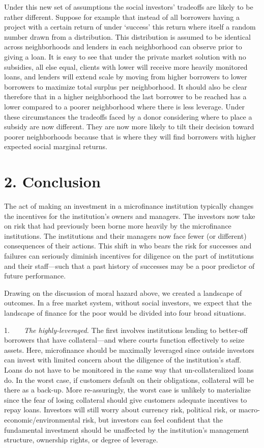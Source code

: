 \documentclass{article}
\begin{document}
Under this new set of assumptions the social investors' tradeoffs are
likely to be rather different. Suppose for example that instead of all
borrowers having a project with a certain return of under `success' this
return where itself a random number drawn from a distribution. This
distribution is assumed to be identical across neighborhoods and lenders
in each neighborhood can observe prior to giving a loan. It is easy to
see that under the private market solution with no subsidies, all else
equal, clients with lower will receive more heavily monitored loans, and
lenders will extend scale by moving from higher borrowers to lower
borrowers to maximize total surplus per neighborhood. It should also be
clear therefore that in a higher neighborhood the last borrower to be
reached has a lower compared to a poorer neighborhood where there is
less leverage. Under these circumstances the tradeoffs faced by a donor
considering where to place a subsidy are now different. They are now
more likely to tilt their decision toward poorer neighborhoods because
that is where they will find borrowers with higher expected social
marginal returns.

\section{2. Conclusion}\label{conclusion}

The act of making an investment in a microfinance institution typically
changes the incentives for the institution's owners and managers. The
investors now take on risk that had previously been borne more heavily
by the microfinance institutions. The institutions and their managers
now face fewer (or different) consequences of their actions. This shift
in who bears the risk for successes and failures can seriously diminish
incentives for diligence on the part of institutions and their
staff---such that a past history of successes may be a poor predictor of
future performance.

Drawing on the discussion of moral hazard above, we created a landscape
of outcomes. In a free market system, without social investors, we
expect that the landscape of finance for the poor would be divided into
four broad situations.

1.  \emph{The highly-leveraged.} The first involves institutions lending
to better-off borrowers that have collateral---and where courts function
effectively to seize assets. Here, microfinance should be maximally
leveraged since outside investors can invest with limited concern about
the diligence of the institution's staff. Loans do not have to be
monitored in the same way that un-collateralized loans do. In the worst
case, if customers default on their obligations, collateral will be
there as a back-up. More re-assuringly, the worst case is unlikely to
materialize since the fear of losing collateral should give customers
adequate incentives to repay loans. Investors will still worry about
currency risk, political risk, or macro-economic/environmental risk, but
investors can feel confident that the fundamental investment should be
unaffected by the institution's management structure, ownership rights,
or degree of leverage.
\end{document}
